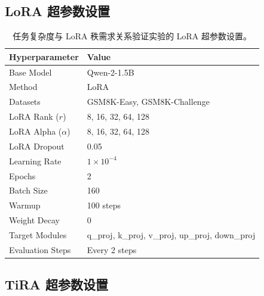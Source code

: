 ﻿\documentclass[UTF8,a4paper,11pt]{ctexart}
\begin{document}
\subsection{LoRA 超参数设置}
\label{app:lora_hyperparams}

\begin{table}[H]
\centering
\caption{任务复杂度与 LoRA 秩需求关系验证实验的 LoRA 超参数设置。}
\begin{tabular}{ll}
\toprule
Hyperparameter & Value \\
\midrule
Base Model & Qwen-2-1.5B \\
Method & LoRA \\
Datasets & GSM8K-Easy, GSM8K-Challenge \\
LoRA Rank ($r$) & 8, 16, 32, 64, 128 \\
LoRA Alpha ($\alpha$) & 8, 16, 32, 64, 128 \\
LoRA Dropout & 0.05 \\
Learning Rate & $1\times10^{-4}$ \\
Epochs & 2 \\
Batch Size & 160 \\
Warmup & 100 steps \\
Weight Decay & 0 \\
Target Modules & q\_proj, k\_proj, v\_proj, up\_proj, down\_proj \\
Evaluation Steps & Every 2 steps \\
\bottomrule
\end{tabular}
\end{table}

\subsection{TiRA 超参数设置}
\label{app:tira_hyperparams}
\end{document}
